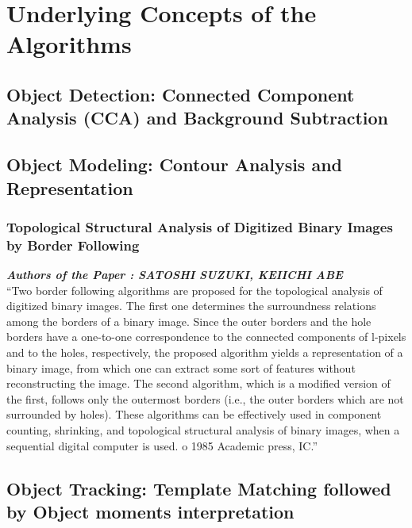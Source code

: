 \documentclass[a4paper,12pt]{book}%
\begin{document}
\chapter{Underlying Concepts of the Algorithms}

\section{Object Detection: Connected Component Analysis (CCA) and Background Subtraction}

\section{Object Modeling: Contour Analysis and Representation}

\subsection{Topological Structural Analysis of Digitized Binary	Images by 	Border Following}

\textbf{\textit{Authors of the Paper : SATOSHI SUZUKI, KEIICHI ABE}}\\

``Two border following algorithms are proposed for the topological analysis of digitized binary images. The first one determines the surroundness relations among the borders of a binary image. Since the outer borders and the hole borders have a one-to-one correspondence to the connected components of l-pixels and to the holes, respectively, the proposed algorithm yields a representation of a binary image, from which one can extract some sort of features without reconstructing the image. The second algorithm, which is a modified version of the first, follows only the outermost borders (i.e., the outer borders which are not surrounded by holes). These algorithms can be effectively used in component counting, shrinking, and topological structural analysis of binary images, when a sequential digital computer is used. o 1985 Academic press, IC.''

\section{Object Tracking: Template Matching followed by Object moments interpretation}






\end{document}
